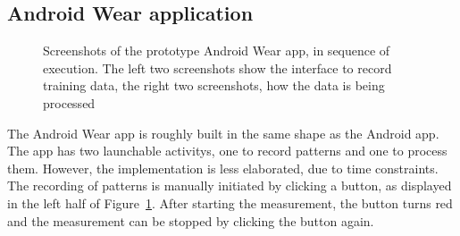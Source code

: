 \subsection{Android Wear application}
\begin{figure}
    \caption{Screenshots of the prototype Android Wear \gls{app}, in sequence of execution. The left two screenshots show the interface to record training data, the right two screenshots, how the data is being processed}
    \label{fig:wearscreenshots}
\end{figure}
The Android Wear \gls{app} is roughly built in the same shape as the Android \gls{app}. The \gls{app} has two launchable \glspl{activity}, one to record patterns and one to process them. However, the implementation is less elaborated, due to time constraints. The recording of patterns is manually initiated by clicking a button, as displayed in the left half of Figure~\ref{fig:wearscreenshots}. After starting the measurement, the button turns red and the measurement can be stopped by clicking the button again.

